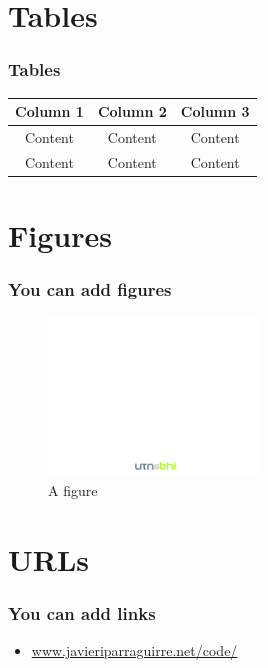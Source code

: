 \documentclass[]{beamer}
\begin{document}
\section{Tables}
\begin{frame}
  \frametitle{Tables}
\small{
\begin{table}
\centering
\begin{tabular}{ccc}
\hline
Column 1 & Column 2 & Column 3\\
\hline 
Content & Content & Content \\
Content & Content & Content \\ 
\hline
\end{tabular}
\end{table}
}
\end{frame} 

\section{Figures}
\begin{frame}
  \frametitle{You can add figures}
  \begin{figure}
    \includegraphics[width=0.5\textwidth]{theme/utn-bhi-page} 
    \caption{A figure}
  \end{figure}
\end{frame}

\section{URLs}
\begin{frame}
  \frametitle{You can add links}
  \begin{itemize}
    \item \small{\url{www.javieriparraguirre.net/code/}}
  \end{itemize}
\end{frame}
\end{document}
